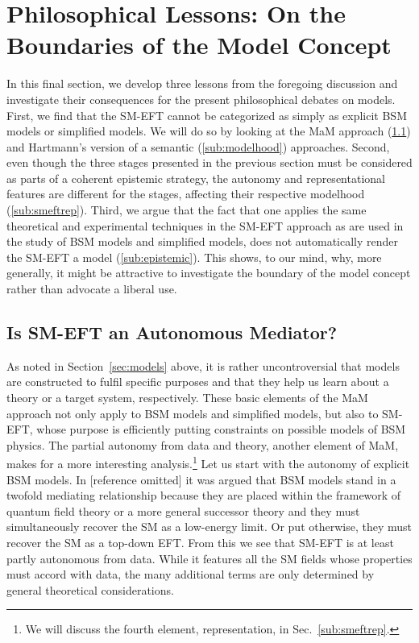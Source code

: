 \section{Philosophical Lessons: On the Boundaries of the Model Concept}	%
\label{sec:analysis}


In this final section, we develop three lessons from the foregoing discussion and investigate their consequences for the present philosophical debates on models. First, we find that the SM-EFT cannot be categorized as simply as explicit BSM models or simplified models. We will do so by looking at the MaM approach (\ref{sub:autonomy}) and Hartmann's version of a semantic (\ref{sub:modelhood}) approaches. Second, even though the three stages presented in the previous section must be considered as parts of a coherent epistemic strategy, the autonomy and representational features are different for the stages, affecting their respective modelhood (\ref{sub:smeftrep}).
Third, we argue that the fact that one applies the same theoretical and experimental techniques in the SM-EFT approach as are used in the study of BSM models and simplified models, does not automatically render the SM-EFT a model (\ref{sub:epistemic}). 
This shows, to our mind, why, more generally, it might be attractive to investigate the boundary of the model concept rather than advocate a liberal use.


\subsection{Is SM-EFT an Autonomous Mediator?} %
\label{sub:autonomy}

As noted in Section~\ref{sec:models} above, it is rather uncontroversial that models are constructed to fulfil specific purposes and that they help us learn about a theory or a target system, respectively.
These basic elements of the MaM approach not only apply to BSM models and simplified models, but also to SM-EFT, whose purpose is efficiently putting constraints on possible models of BSM physics. 
The partial autonomy from data and theory, another element of MaM, makes for a more interesting analysis.\footnote{We will discuss the fourth element, representation, in Sec.~\ref{sub:smeftrep}.}
Let us start with the autonomy of explicit BSM models.
In [reference omitted] it was argued that BSM models stand in a twofold mediating relationship because they are placed within the framework of quantum field theory or a more general successor theory and they must simultaneously recover the SM as a low-energy limit. 
Or put otherwise, they must recover the SM as a top-down EFT.
From this we see that SM-EFT is at least partly autonomous from data. While it features all the SM fields whose properties must accord with data, the many additional terms are only determined by general theoretical considerations.

